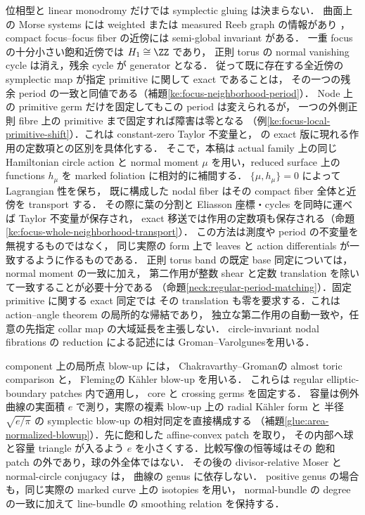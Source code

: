 位相型と linear monodromy だけでは symplectic gluing は決まらない．
曲面上の Morse systems には weighted または measured Reeb graph の情報があり
\cite{DMT,IKM}，compact focus--focus fiber の近傍には
semi-global invariant がある\cite[Theorem 2.1]{VuNgoc}．
一重 focus の十分小さい飽和近傍では $H_1\cong\ZZ$ であり，
正則 torus の normal vanishing cycle は消え，残余 cycle が generator となる．
従って既に存在する全近傍の symplectic map が指定 primitive に関して exact であることは，
その一つの残余 period の一致と同値である（補題\ref{ke:focus-neighborhood-period}）．
Node 上の primitive germ だけを固定してもこの period は変えられるが，
一つの外側正則 fibre 上の primitive まで固定すれば障害は零となる
（例\ref{ke:focus-local-primitive-shift}）．これは constant-zero Taylor 不変量と，
\cite[\S7]{VuNgoc}の exact 版に現れる作用の定数項との区別を具体化する．
そこで，本稿は actual family 上の同じ Hamiltonian circle action と
normal moment $\mu$ を用い，reduced surface 上の functions $h_\mu$ を
marked foliation に相対的に補間する．
$\{\mu,h_\mu\}=0$ によって Lagrangian 性を保ち，
既に構成した nodal fiber はその compact fiber 全体と近傍を transport する．
その際に葉の分割と Eliasson 座標・cycles を同時に運べば Taylor 不変量が保存され，
exact 移送では作用の定数項も保存される（命題\ref{ke:focus-whole-neighborhood-transport}）．
この方法は測度や period の不変量を無視するものではなく，
同じ実際の form 上で leaves と action differentials が一致するように作るものである．
正則 torus band の既定 base 同定については，normal moment の一致に加え，
第二作用が整数 shear と定数 translation を除いて一致することが必要十分である
（命題\ref{neck:regular-period-matching}）．固定 primitive に関する exact 同定では
その translation も零を要求する．これは action--angle theorem の局所的な帰結であり，
独立な第二作用の自動一致や，任意の先指定 collar map の大域延長を主張しない．
circle-invariant nodal fibrations の reduction による記述には
Groman--Varolgunes\cite[\S7.3]{GV}を用いる．

component 上の局所点 blow-up には，
Chakravarthy--Groman\cite[Theorem 1.1]{CGblowup}の almost toric comparison と，
Fleming\cite[Proposition 4.6, Construction 4.7]{Fleming}の Kähler blow-up を用いる．
これらは regular elliptic-boundary patches 内で適用し，
core と crossing germs を固定する．
容量は例外曲線の実面積 $e$ で測り，実際の複素 blow-up 上の radial K\"ahler form と
半径 $\sqrt{e/\pi}$ の symplectic blow-up の相対同定を直接構成する
（補題\ref{glue:area-normalized-blowup}）．先に飽和した affine-convex patch を取り，
その内部へ球と容量 triangle が入るよう $e$ を小さくする．比較写像の恒等域はその
飽和 patch の外であり，球の外全体ではない．
その後の divisor-relative Moser と normal-circle conjugacy は，
曲線の genus に依存しない．
positive genus の場合も，同じ実際の marked curve 上の isotopies を用い，
normal-bundle の degree の一致に加えて line-bundle の smoothing relation を保持する．

